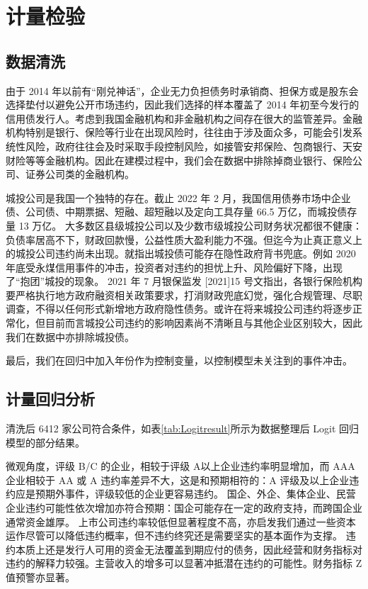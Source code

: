 
\chapter{计量检验}
\section{数据清洗}
由于 2014 年以前有“刚兑神话”，企业无力负担债务时承销商、担保方或是股东会选择垫付以避免公开市场违约，因此我们选择的样本覆盖了 2014 年初至今发行的信用债发行人。考虑到我国金融机构和非金融机构之间存在很大的监管差异。金融机构特别是银行、保险等行业在出现风险时，往往由于涉及面众多，可能会引发系统性风险，政府往往会及时采取手段控制风险，如接管安邦保险、包商银行、天安财险等等金融机构。因此在建模过程中，我们会在数据中排除掉商业银行、保险公司、证券公司类的金融机构。

城投公司是我国一个独特的存在。截止 2022 年 2 月，我国信用债券市场中企业债、公司债、中期票据、短融、超短融以及定向工具存量 66.5 万亿，而城投债存量 13 万亿。
大多数区县级城投公司以及少数市级城投公司财务状况都很不健康：负债率居高不下，财政回款慢，公益性质大盈利能力不强。但迄今为止真正意义上的城投公司违约尚未出现。\Textcite{钟辉勇2016城投债的担保可信吗}就指出城投债可能存在隐性政府背书兜底。例如 2020 年底受永煤信用事件的冲击，投资者对违约的担忧上升、风险偏好下降，出现了“抱团”城投的现象。
2021 年 7 月银保监发 [2021]15 号文指出，各银行保险机构要严格执行地方政府融资相关政策要求，打消财政兜底幻觉，强化合规管理、尽职调查，不得以任何形式新增地方政府隐性债务。或许在将来城投公司违约将逐步正常化，但目前而言城投公司违约的影响因素尚不清晰且与其他企业区别较大，因此我们在数据中亦排除城投债。

最后，我们在回归中加入年份作为控制变量，以控制模型未关注到的事件冲击。

\section{计量回归分析}
清洗后 6412 家公司符合条件，如表\ref{tab:Logitresult}所示为数据整理后 Logit 回归模型的部分结果。


微观角度，评级 B/C 的企业，相较于评级 A以上企业违约率明显增加，而 AAA 企业相较于 AA 或 A 违约率差异不大，这是和预期相符的：A 评级及以上企业违约应是预期外事件，评级较低的企业更容易违约。
国企、外企、集体企业、民营企业违约可能性依次增加亦符合预期：国企可能存在一定的政府支持\autocite{mo2021china}，而跨国企业通常资金雄厚。
上市公司违约率较低但显著程度不高，亦启发我们通过一些资本运作尽管可以降低违约概率，但不违约终究还是需要坚实的基本面作为支撑。
违约本质上还是发行人可用的资金无法覆盖到期应付的债务，因此经营和财务指标对违约的解释力较强。主营收入的增多可以显著冲抵潜在违约的可能性。财务指标 Z 值预警亦显著。

